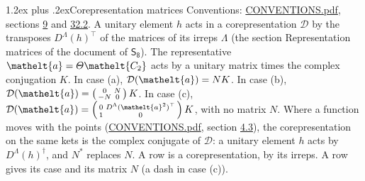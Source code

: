 \documentclass[10pt,a4paper]{article}
\makeatletter
\renewcommand\section{\@startsection{section}{1}{\z@}{-3ex plus -1ex minus -.2ex}%
  {1.2ex plus .2ex}{\normalfont\large\sffamily\bfseries\color{parttitle}}}
\numberwithin{equation}{section}
\newcommand{\eltfont}[1]{{\let\sigma\eltsigma\mathelt{#1}}}
\newcommand{\grp}[1]{\mathsf{#1}}
\newcommand{\elt}[1]{\eltfont{#1}}
\makeatother
\begin{document}
\section{Corepresentation matrices}\label{s:corep_matrices}
Conventions: \href{../../CONVENTIONS.pdf}{CONVENTIONS.pdf}, sections \href{../../../rotation/CONVENTIONS.pdf\#conv.9}{9} and \href{../../CONVENTIONS.pdf\#conv.32.2}{32.2}.
A unitary element $h$ acts in a corepresentation $\mathcal{D}$ by the transposes $D^{\Lambda}(h)^{\top}$ of the matrices of its irreps $\Lambda$ (the section Representation matrices of the document of \href{../../../rotation/data/pdf/S8.pdf}{$\grp{S_{8}}$}). The representative $\elt{a} = \varTheta\elt{C_{2}}$ acts by a unitary matrix times the complex conjugation $K$.
In case (a), $\mathcal{D}(\elt{a}) = NK$. In case (b), $\mathcal{D}(\elt{a}) = \left(\begin{smallmatrix} 0 & N \\ -N & 0 \end{smallmatrix}\right) K$. In case (c), $\mathcal{D}(\elt{a}) = \left(\begin{smallmatrix} 0 & D^{\Lambda}(\elt{a}^2)^{\top} \\ 1 & 0 \end{smallmatrix}\right) K$, with no matrix $N$.
Where a function moves with the points (\href{../../CONVENTIONS.pdf}{CONVENTIONS.pdf}, section \href{../../../rotation/CONVENTIONS.pdf\#conv.4.3}{4.3}), the corepresentation on the same kets is the complex conjugate of $\mathcal{D}$: a unitary element $h$ acts by $D^{\Lambda}(h)^{\dagger}$, and $N^{*}$ replaces $N$.
A row is a corepresentation, by its irreps. A row gives its case and its matrix $N$ (a dash in case (c)).
\end{document}
